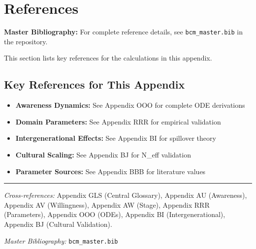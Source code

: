 \section{References}

\nocite{bcm_master}

\label{sec:calc-references}

\begin{tcolorbox}[colback=blue!5!white, colframe=blue!75!black]
\textbf{Master Bibliography:} For complete reference details, see
\texttt{bcm\_master.bib} in the repository.

This section lists key references for the calculations in this appendix.
\end{tcolorbox}

\subsection{Key References for This Appendix}

\begin{itemize}[nosep]
    \item \textbf{Awareness Dynamics:} See Appendix OOO for complete ODE derivations
    \item \textbf{Domain Parameters:} See Appendix RRR for empirical validation
    \item \textbf{Intergenerational Effects:} See Appendix BI for spillover theory
    \item \textbf{Cultural Scaling:} See Appendix BJ for N\_eff validation
    \item \textbf{Parameter Sources:} See Appendix BBB for literature values
\end{itemize}



\vspace{1em}
\hrule
\vspace{0.5em}

\noindent\textit{Cross-references:}
Appendix GLS (Central Glossary),
Appendix AU (Awareness),
Appendix AV (Willingness),
Appendix AW (Stage),
Appendix RRR (Parameters),
Appendix OOO (ODEs),
Appendix BI (Intergenerational),
Appendix BJ (Cultural Validation).

\noindent\textit{Master Bibliography:} \texttt{bcm\_master.bib}


